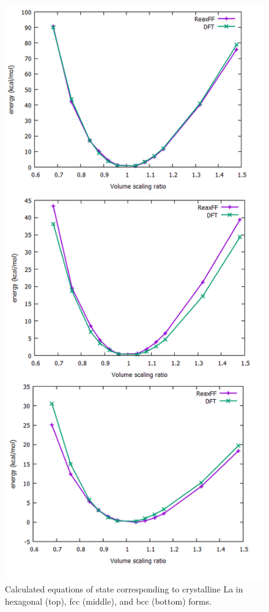 \documentclass[journal=jpcafh,manuscript=article]{achemso}
\begin{document}
\begin{figure}[hbtp]
\centering
\includegraphics[scale=0.5]{Paper/images/LaEoS.png}
\caption{Calculated equations of state corresponding to crystalline La in hexagonal (top), fcc (middle), and bcc (bottom) forms.}
\label{fig:laeos}
\end{figure}
\end{document}
